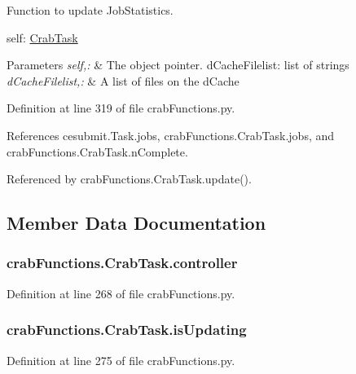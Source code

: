 Function to update Job\-Statistics. 

self\-: \hyperlink{classcrabFunctions_1_1CrabTask}{Crab\-Task} 
\begin{DoxyParams}{Parameters}
{\em self,\-:} & The object pointer.  d\-Cache\-Filelist\-: list of strings \\
\hline
{\em d\-Cache\-Filelist,\-:} & A list of files on the d\-Cache \\
\hline
\end{DoxyParams}


Definition at line 319 of file crab\-Functions.\-py.



References cesubmit.\-Task.\-jobs, crab\-Functions.\-Crab\-Task.\-jobs, and crab\-Functions.\-Crab\-Task.\-n\-Complete.



Referenced by crab\-Functions.\-Crab\-Task.\-update().



\subsection{Member Data Documentation}
\subsubsection[{controller}]{\setlength{\rightskip}{0pt plus 5cm}crab\-Functions.\-Crab\-Task.\-controller}\label{classcrabFunctions_1_1CrabTask_a653cc1b50b00d31ecae424bb7f301800}


Definition at line 268 of file crab\-Functions.\-py.

\subsubsection[{is\-Updating}]{\setlength{\rightskip}{0pt plus 5cm}crab\-Functions.\-Crab\-Task.\-is\-Updating}\label{classcrabFunctions_1_1CrabTask_a67ffd96ff5dea4a166810258109f85cc}


Definition at line 275 of file crab\-Functions.\-py.



